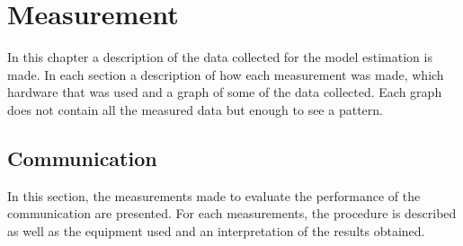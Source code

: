 \chapter{Measurement}\label{cha:measurement}

In this chapter a description of the data collected for the model estimation is made. In each section a description of how each measurement was made, which hardware that was used and a graph of some of the data collected. Each graph does not contain all the measured data but enough to see a pattern. 




%






\section{Communication}

In this section, the measurements made to evaluate the performance of the communication are presented. For each measurements, the procedure is described as well as the equipment used and an interpretation of the results obtained.



